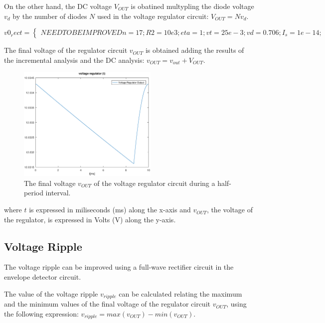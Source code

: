 On the other hand, the DC voltage $V_{OUT}$ is obatined multypling the diode voltage $v_d$ by the number of diodes $N$ used in the voltage regulator circuit: $V_{OUT}=N v_d$.

\[
v0_rect =
\left\{\begin{matrix}
NEED TO BE IMPROVED
n=17;
R2=10e3;
eta=1;
vt=25e-3;
vd=0.706;
I_s=1e-14;
\end{matrix}\right.
\]

The final voltage of the regulator circuit $v_{OUT}$ is obtained adding the results of the incremental analysis and the DC analysis: $v_{OUT}=v_{out}+V_{OUT}$.

\begin{figure}[H] \centering
\includegraphics[width=0.6\textwidth]{output.eps}
\caption{The final voltage $v_{OUT}$ of the voltage regulator circuit during a half-period interval.}
\label{fig:output}
\end{figure}

where $t$ is expressed in miliseconds (ms) along the x-axis and 
$v_{OUT}$, the voltage of the regulator, is expressed in Volts (V) along the y-axis.

\subsection{Voltage Ripple}
\label{subsec:ripple}

The voltage ripple can be improved using a full-wave rectifier circuit in the envelope detector circuit. 

The value of the voltage ripple $v_{ripple}$ can be calculated relating the maximum and the minimum values of the final voltage of the regulator circuit $v_{OUT}$, using the following expression: $v_{ripple}=max(v_{OUT})-min(v_{OUT})$.

\begin{center}
   \begin{tabular}{|c||c|}
      \hline    
       {\bf THIS SHOULD PRINT THE RIPPLE BELOW \\
      \hline
        
   \end{tabular}
 \end{center}

